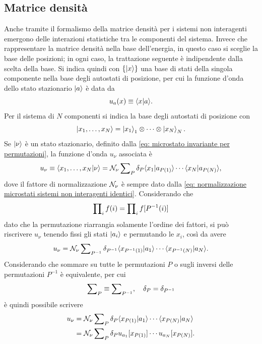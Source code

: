 \subsection{Matrice densità}
Anche tramite il formalismo della matrice densità per i sistemi non interagenti emergono delle interazioni statistiche tra le componenti del sistema. Invece che rappresentare la matrice densità nella base dell'energia, in questo caso si sceglie la base delle posizioni; in ogni caso, la trattazione seguente è indipendente dalla scelta della base. Si indica quindi con $\{\ket{x}\}$ una base di stati della singola componente nella base degli autostati di posizione, per cui la funzione d'onda dello stato stazionario $\ket{a}$ è data da
\begin{equation}
    u_a(x) \equiv \langle x | a \rangle.
\end{equation}
Per il sistema di $N$ componenti si indica la base degli autostati di posizione con
\begin{equation}
    \ket{x_1,\dots,x_N} = \ket{x_1}_1 \otimes \cdots \otimes \ket{x_N}_N.
\end{equation}
Se $\ket{\nu}$ è un stato stazionario, definito dalla \eqref{eq: microstato invariante per permutazioni}, la funzione d'onda $u_\nu$ associata è
\begin{equation}
    u_\nu \equiv \langle x_1,\dots,x_N | \nu \rangle = \mathcal{N}_\nu\sum\nolimits_P\delta_P\langle x_1 | a_{P(1)} \rangle\cdots\langle x_N | a_{P(N)} \rangle,
\end{equation}
dove il fattore di normalizzazione $\mathcal{N}_\nu$ è sempre dato dalla \eqref{eq: normalizzazione microstati sistemi non interagenti identici}. Considerando che
\begin{equation}
\label{eq: proprietà produttoria}
    \prod\nolimits_if(i) = \prod\nolimits_if[P^{-1}(i)]
\end{equation}
dato che la permutazione riarrangia solamente l'ordine dei fattori, si può riscrivere $u_\nu$ tenendo fissi gli stati $\ket{a_i}$ e permutando le $x_i$, così da avere
\begin{equation}
    u_\nu = \mathcal{N}_\nu\sum\nolimits_{P^{-1}}\delta_{P^{-1}}\langle x_{P^{-1}(1)} | a_1 \rangle\cdots\langle x_{P^{-1}(N)} | a_N \rangle.
\end{equation}
Considerando che sommare su tutte le permutazioni $P$ o sugli inversi delle permutazioni $P^{-1}$ è equivalente, per cui
\begin{equation}
    \sum\nolimits_P \equiv \sum\nolimits_{P^{-1}},\quad \delta_P = \delta_{P^{-1}}
\end{equation}
è quindi possibile scrivere 
\begin{equation}
\label{eq: funzione onda sistemi non interagente identico}
    \begin{split}
        u_\nu &= \mathcal{N}_\nu\sum\nolimits_P\delta_P\langle x_{P(1)} | a_1 \rangle\cdots\langle x_{P(N)} | a_N \rangle \\
        &= \mathcal{N}_\nu\sum\nolimits_P\delta_Pu_{a_1}[x_{P(1)}]\cdots u_{a_N}[x_{P(N)}].
    \end{split}
\end{equation}
